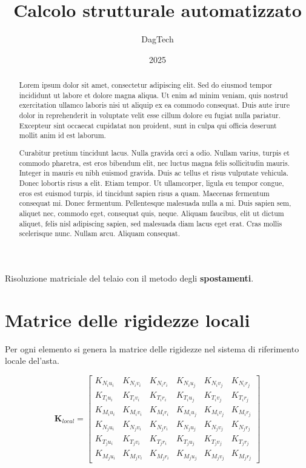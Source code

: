 \documentclass[10pt,a4paper]{article}
\title{Calcolo strutturale automatizzato}
\author{DagTech}
\date{2025}
\begin{document}
\maketitle

\begin{abstract}
Lorem ipsum dolor sit amet, consectetur adipiscing elit. Sed do eiusmod tempor incididunt ut labore et dolore magna aliqua. Ut enim ad minim veniam, quis nostrud exercitation ullamco laboris nisi ut aliquip ex ea commodo consequat. Duis aute irure dolor in reprehenderit in voluptate velit esse cillum dolore eu fugiat nulla pariatur. Excepteur sint occaecat cupidatat non proident, sunt in culpa qui officia deserunt mollit anim id est laborum.

Curabitur pretium tincidunt lacus. Nulla gravida orci a odio. Nullam varius, turpis et commodo pharetra, est eros bibendum elit, nec luctus magna felis sollicitudin mauris. Integer in mauris eu nibh euismod gravida. Duis ac tellus et risus vulputate vehicula. Donec lobortis risus a elit. Etiam tempor. Ut ullamcorper, ligula eu tempor congue, eros est euismod turpis, id tincidunt sapien risus a quam. Maecenas fermentum consequat mi. Donec fermentum. Pellentesque malesuada nulla a mi. Duis sapien sem, aliquet nec, commodo eget, consequat quis, neque. Aliquam faucibus, elit ut dictum aliquet, felis nisl adipiscing sapien, sed malesuada diam lacus eget erat. Cras mollis scelerisque nunc. Nullam arcu. Aliquam consequat.
\end{abstract}


\tableofcontents

\newpage
\section*{}
Risoluzione matriciale del telaio con il metodo degli \textbf{spostamenti}.

\section{Matrice delle rigidezze locali}
Per ogni elemento si genera la matrice delle rigidezze nel sistema di riferimento locale del'asta.

\begin{equation}
\mathbf{K}_{local} = 
\begin{bmatrix}
K_{N_iu_i} & K_{N_iv_i} & K_{N_ir_i} & K_{N_iu_j} & K_{N_iv_j} & K_{N_ir_j} \\
K_{T_iu_i} & K_{T_iv_i} & K_{T_ir_i} & K_{T_iu_j} & K_{T_iv_j} & K_{T_ir_j} \\
K_{M_iu_i} & K_{M_iv_i} & K_{M_ir_i} & K_{M_iu_j} & K_{M_iv_j} & K_{M_ir_j} \\
K_{N_ju_i} & K_{N_jv_i} & K_{N_jr_i} & K_{N_ju_j} & K_{N_jv_j} & K_{N_jr_j} \\
K_{T_ju_i} & K_{T_jv_i} & K_{T_jr_i} & K_{T_ju_j} & K_{T_jv_j} & K_{T_jr_j} \\
K_{M_ju_i} & K_{M_jv_i} & K_{M_jr_i} & K_{M_ju_j} & K_{M_jv_j} & K_{M_jr_j}
\end{bmatrix} 
\end{equation}
\end{document}
